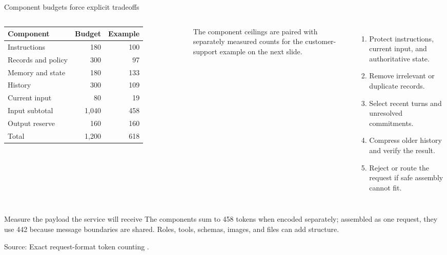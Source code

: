 \documentclass[aspectratio=169]{beamer}
\newcommand{\slidesource}[1]{\par\vfill\noindent\parbox{\linewidth}{\tiny\color{hrgray}\raggedright\sloppy Source: #1}}
\newcommand{\visualdescription}[1]{\par\vspace{.2em}\noindent\parbox{\linewidth}{\centering\tiny\color{hrgray}#1}}
\begin{document}
\begin{frame}{Component budgets force explicit tradeoffs}
\footnotesize
\begin{columns}[T]
\centering
\renewcommand{\arraystretch}{.9}
\begin{tabular}{@{}lrr@{}}
\toprule
\textbf{Component} & \textbf{Budget} & \textbf{Example} \\
\midrule
Instructions & 180 & 100 \\
Records and policy & 300 & 97 \\
Memory and state & 180 & 133 \\
History & 300 & 109 \\
Current input & 80 & 19 \\
\midrule
Input subtotal & 1,040 & 458 \\
Output reserve & 160 & 160 \\
\midrule
Total & 1,200 & 618 \\
\bottomrule
\end{tabular}
\visualdescription{The component ceilings are paired with separately measured counts for the customer-support example on the next slide.}
\begin{enumerate}\itemsep3pt
  \item Protect instructions, current input, and authoritative state.
  \item Remove irrelevant or duplicate records.
  \item Select recent turns and unresolved commitments.
  \item Compress older history and verify the result.
  \item Reject or route the request if safe assembly cannot fit.
\end{enumerate}
\end{columns}
\vspace{.35em}
\begin{block}{Measure the payload the service will receive}
The components sum to 458 tokens when encoded separately; assembled as one request, they use 442 because message boundaries are shared. Roles, tools, schemas, images, and files can add structure.
\end{block}
\slidesource{Exact request-format token counting \parencite{OpenAI2026TokenCounting}.}
\end{frame}
\end{document}
